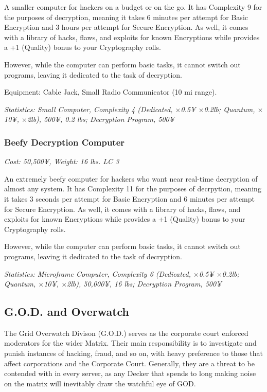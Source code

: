 \begin{multicols}{3}
	A smaller computer for hackers on a budget or on the go. It has Complexity 9 for the purposes of decryption, meaning it takes 6 minutes per attempt for Basic Encryption and 3 hours per attempt for Secure Encryption. As well, it comes with a library of hacks, flaws, and exploits for known Encryptions while provides a +1 (Quality) bonus to your Cryptography rolls.
	
	However, while the computer can perform basic tasks, it cannot switch out programs, leaving it dedicated to the task of decryption.
	
	Equipment: Cable Jack, Small Radio Communicator (10 mi range).
	
	\textit{\textcolor{OliveGreen}{Statistics: Small Computer, Complexity 4 (Dedicated, \(\times\)0.5¥ \(\times\)0.2lb; Quantum, \(\times\)10¥, \(\times\)2lb), 500¥, 0.2 lbs; Decryption Program, 500¥}}
	
	
	\subsubsection*{Beefy Decryption Computer}
	
	\textit{\textcolor{NavyBlue}{Cost: 50,500¥, Weight: 16 lbs. LC 3}}
	
	An extremely beefy computer for hackers who want near real-time decryption of almost any system. It has Complexity 11 for the purposes of decrpytion, meaning it takes 3 seconds per attempt for Basic Encryption and 6 minutes per attempt for Secure Encryption. As well, it comes with a library of hacks, flaws, and exploits for known Encryptions while provides a +1 (Quality) bonus to your Cryptography rolls.
	
	However, while the computer can perform basic tasks, it cannot switch out programs, leaving it dedicated to the task of decryption.
	
	\textit{\textcolor{OliveGreen}{Statistics: Microframe Computer, Complexity 6 (Dedicated, \(\times\)0.5¥ \(\times\)0.2lb; Quantum, \(\times\)10¥, \(\times\)2lb), 50,000¥, 16 lbs; Decryption Program, 500¥}}
	
	\subsection{G.O.D. and Overwatch}
	
	The Grid Overwatch Divison (G.O.D.) serves as the corporate court enforced moderators for the wider Matrix. Their main responsibility is to investigate and punish instances of hacking, fraud, and so on, with heavy preference to those that affect corporations and the Corporate Court. Generally, they are a threat to be contended with in every server, as any Decker that spends to long making noise on the matrix will inevitably draw the watchful eye of GOD. 
	

\end{multicols}
